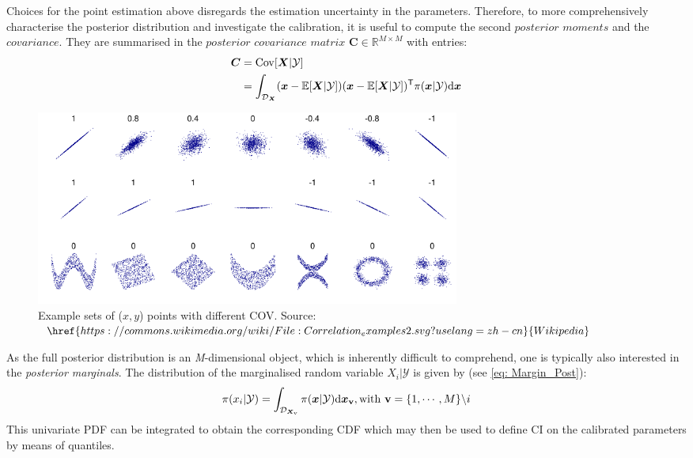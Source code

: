 Choices for the point estimation above disregards the estimation uncertainty in the parameters. Therefore, to more comprehensively characterise the posterior distribution and investigate the calibration, it is useful to compute the second $\textit{posterior moments}$ and the $\textit{covariance}$. They are summarised in the $\textit{posterior covariance matrix}$ $\boldsymbol{C} \in \mathbb{R}^{M \times M}$ with entries:
\begin{equation}
    \label{eq: COV}
    \begin{aligned}
    \boldsymbol{C}  &= {\rm{Cov}}[\boldsymbol{X}|\mathcal{Y}] \\
            &=\int_{\mathcal{D}_{\boldsymbol{X}}} 
            (\boldsymbol{x} - \mathbb{E}[\boldsymbol{X}|\mathcal{Y}])(\boldsymbol{x} - \mathbb{E}[\boldsymbol{X}|\mathcal{Y}])^{\mathsf{T}} \pi(\boldsymbol{x}|\mathcal{Y}) {\rm{d}} \boldsymbol{x} 
    \end{aligned}  
\end{equation}
\begin{figure}[htbp]
    \centering
    \includegraphics[width = 140mm]{Figures/figure-COV.pdf}
    \caption{Example sets of ($x,y$) points with different \acrshort{COV}. Source: $\href{https://commons.wikimedia.org/wiki/File:Correlation_examples2.svg?uselang=zh-cn}{Wikipedia}$}
    \label{fig: COV}
\end{figure}
As  the full posterior distribution is an \textit{M}-dimensional object, which is inherently difficult to comprehend, one is typically also interested in the \textit{posterior marginals}. The distribution of the marginalised random variable $X_{i}|\mathcal{Y}$ is given by (see \cref{eq: Margin_Post}):
\begin{equation}
    \label{eq: Margin_Post}
    \pi(x_{i}|\mathcal{Y}) = \int_{\mathcal{D}_{\boldsymbol{X}_{\rm{\boldsymbol{v}}}}}
          \pi(\boldsymbol{x}|\mathcal{Y}){\rm{d}} \boldsymbol{x_{\rm{\boldsymbol{v}}}}, {\rm{with}} \ \boldsymbol{\mathrm{v}} = \{1,\cdots,M\} \backslash i  
\end{equation}
This univariate \acrshort{PDF} can be integrated to obtain the corresponding \acrfull{CDF} which may then be used to define \acrfull{CI} on the calibrated parameters by means of quantiles.

